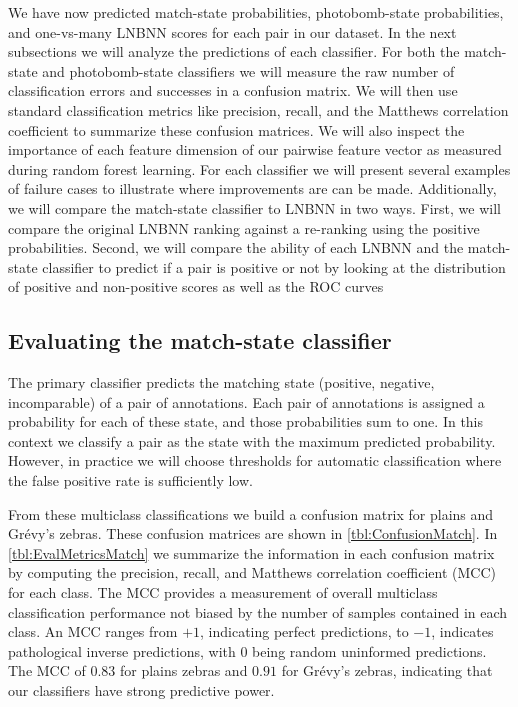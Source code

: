     We have now predicted match-state probabilities, photobomb-state probabilities, and one-vs-many LNBNN scores
      for each pair in our dataset.
    In the next subsections we will analyze the predictions of each classifier.
    For both the match-state and photobomb-state classifiers we will measure the raw number of classification
      errors and successes in a confusion matrix.
    We will then use standard classification metrics like precision, recall, and the Matthews correlation
      coefficient to summarize these confusion matrices.
    We will also inspect the importance of each feature dimension of our pairwise feature vector as measured
      during random forest learning.
    For each classifier we will present several examples of failure cases to illustrate where improvements are
      can be made.
    Additionally, we will compare the match-state classifier to LNBNN in two ways.
    First, we will compare the original LNBNN ranking against a re-ranking using the positive probabilities.
    Second, we will compare the ability of each LNBNN and the match-state classifier to predict if a pair is
      positive or not by looking at the distribution of positive and non-positive scores as well as the ROC curves


    \FloatBarrier{}
    \subsection{Evaluating the match-state classifier}

        The primary classifier predicts the matching state (positive, negative, incomparable) of a pair of
          annotations.
        Each pair of annotations is assigned a probability for each of these state, and those probabilities sum
          to one.
        In this context we classify a pair as the state with the maximum predicted probability.
        However, in practice we will choose thresholds for automatic classification where the false positive rate
          is sufficiently low.

        From these multiclass classifications we build a confusion matrix for plains and Grévy's zebras.
        These confusion matrices are shown in \cref{tbl:ConfusionMatch}.
        In \cref{tbl:EvalMetricsMatch} we summarize the information in each confusion matrix by computing the
          precision, recall, and Matthews correlation coefficient (MCC)~\cite{powers_evaluation_2011} for each
          class.
        The MCC provides a measurement of overall multiclass classification performance not biased by the number
          of samples contained in each class.
        An MCC ranges from $+1$, indicating perfect predictions, to $-1$, indicates pathological inverse
          predictions, with $0$ being random uninformed predictions.
        The MCC of $0.83$ for plains zebras and $0.91$ for Grévy's zebras, indicating that our classifiers have
          strong predictive power.

